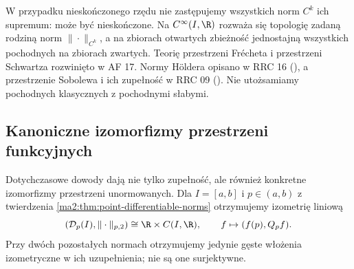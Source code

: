 \begin{uwaga}
W przypadku nieskończonego rzędu nie zastępujemy
wszystkich norm $C^k$ ich supremum: może być
nieskończone. Na $C^\infty(I,\R)$ rozważa się
topologię zadaną rodziną norm $\|\cdot\|_{C^k}$,
a na zbiorach otwartych zbieżność jednostajną
wszystkich pochodnych na zbiorach zwartych.
Teorię przestrzeni Frécheta i przestrzeni Schwartza
rozwinięto w AF 17. Normy Höldera opisano
w RRC 16 (), a przestrzenie
Sobolewa i ich zupełność w RRC 09
(). Nie utożsamiamy
pochodnych klasycznych z pochodnymi słabymi.
\end{uwaga}


\subsection{Kanoniczne izomorfizmy przestrzeni funkcyjnych}

Dotychczasowe dowody dają nie tylko zupełność, ale
również konkretne izomorfizmy przestrzeni unormowanych.
Dla $I=[a,b]$ i $p\in(a,b)$ z twierdzenia
\ref{ma2:thm:point-differentiable-norms} otrzymujemy
izometrię liniową
\[
 (\mathcal D_p(I),\|\cdot\|_{p,2})
 \cong\R\times C(I,\R),\qquad f\mapsto(f(p),Q_pf).
\]
Przy dwóch pozostałych normach otrzymujemy jedynie
gęste włożenia izometryczne w ich uzupełnienia;
nie są one surjektywne.

